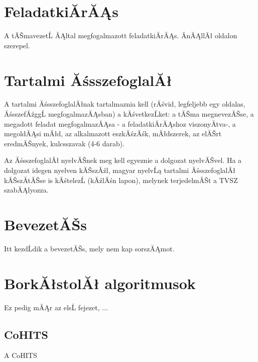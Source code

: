 \documentclass[12pt]{report}
\theoremstyle{definition}
\begin{document}
\chapter*{FeladatkiĂ­rĂĄs}

A tĂŠmavezetĹ ĂĄltal megfogalmazott feladatkiĂ­rĂĄs. ĂnĂĄllĂł oldalon szerepel.

\chapter*{Tartalmi ĂśsszefoglalĂł}

A tartalmi ĂśsszefoglalĂłnak tartalmaznia kell (rĂśvid, legfeljebb egy oldalas, ĂśsszefĂźggĹ megfogalmazĂĄsban)
a kĂśvetkezĹket: a tĂŠma megnevezĂŠse, a megadott feladat megfogalmazĂĄsa - a feladatkiĂ­rĂĄshoz viszonyĂ­tva-,
a megoldĂĄsi mĂłd, az alkalmazott eszkĂśzĂśk, mĂłdszerek, az elĂŠrt eredmĂŠnyek, kulcsszavak (4-6 darab).

Az ĂśsszefoglalĂł nyelvĂŠnek meg kell egyeznie a dolgozat nyelvĂŠvel. Ha a dolgozat idegen nyelven kĂŠszĂźl,
magyar nyelvĹą tartalmi ĂśsszefoglalĂł kĂŠszĂ­tĂŠse is kĂśtelezĹ (kĂźlĂśn lapon), melynek terjedelmĂŠt a TVSZ szabĂĄlyozza.


\chapter*{BevezetĂŠs}

Itt kezdĹdik a bevezetĂŠs, mely nem kap sorszĂĄmot.



\chapter{BorkĂłstolĂł algoritmusok}

Ez pedig mĂĄr az elsĹ fejezet, ...

\section{CoHITS}
A CoHITS

\end{document}
